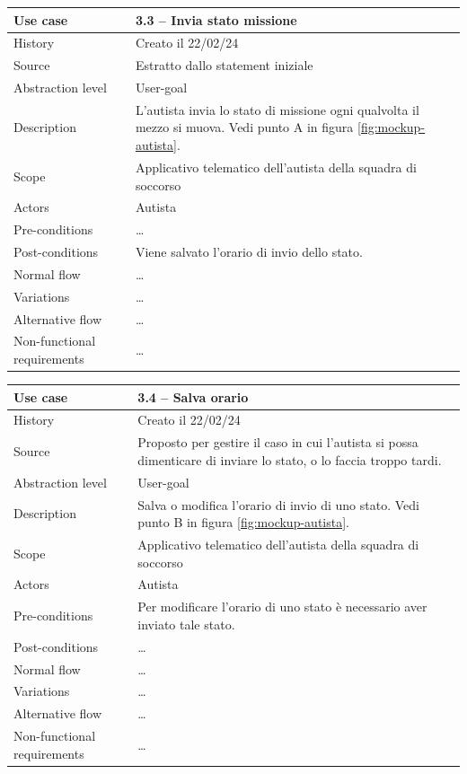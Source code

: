 \documentclass{article}
\begin{document}
    \begin{table}
        \begin{tabularx}{\textwidth}{l|X}
            Use case & \textbf{3.3 – Invia stato missione}\\
            \hline
            History & Creato il 22/02/24\\
            Source & Estratto dallo statement iniziale\\
            Abstraction level & User-goal\\
            Description & L'autista invia lo stato di missione ogni qualvolta il mezzo si muova. Vedi punto A in figura \ref{fig:mockup-autista}.\\
            Scope & Applicativo telematico dell'autista della squadra di soccorso\\
            Actors & Autista\\
            Pre-conditions & \dots \\
            Post-conditions & Viene salvato l'orario di invio dello stato. \\
            Normal flow & \dots\\
            Variations & \dots \\
            Alternative flow & \dots \\
            Non-functional requirements & \dots
        \end{tabularx}
        \label{tab:usecase3.3}
    \end{table}

    \begin{table}
        \begin{tabularx}{\textwidth}{l|X}
            Use case & \textbf{3.4 – Salva orario}\\
            \hline
            History & Creato il 22/02/24\\
            Source & Proposto per gestire il caso in cui l'autista si possa dimenticare di inviare lo stato, o lo faccia troppo tardi.\\
            Abstraction level & User-goal \\
            Description & Salva o modifica l'orario di invio di uno stato. Vedi punto B in figura \ref{fig:mockup-autista}.\\
            Scope & Applicativo telematico dell'autista della squadra di soccorso\\
            Actors & Autista\\
            Pre-conditions & Per modificare l'orario di uno stato è necessario aver inviato tale stato.\\
            Post-conditions & \dots \\
            Normal flow & \dots\\
            Variations & \dots \\
            Alternative flow & \dots \\
            Non-functional requirements & \dots
        \end{tabularx}
        \label{tab:usecase3.4}
    \end{table}
\end{document}
